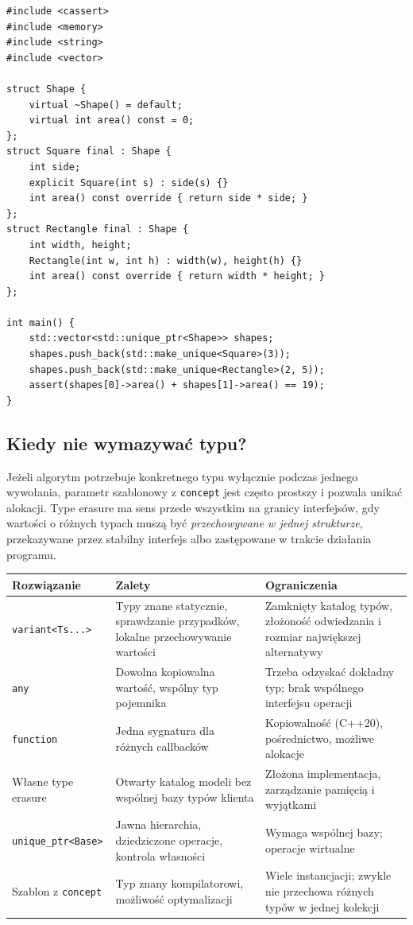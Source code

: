 \begin{lstlisting}[caption={Polimorfizm przez bazę i \texttt{unique\_ptr}; kompletny program.}]
#include <cassert>
#include <memory>
#include <string>
#include <vector>

struct Shape {
    virtual ~Shape() = default;
    virtual int area() const = 0;
};
struct Square final : Shape {
    int side;
    explicit Square(int s) : side(s) {}
    int area() const override { return side * side; }
};
struct Rectangle final : Shape {
    int width, height;
    Rectangle(int w, int h) : width(w), height(h) {}
    int area() const override { return width * height; }
};

int main() {
    std::vector<std::unique_ptr<Shape>> shapes;
    shapes.push_back(std::make_unique<Square>(3));
    shapes.push_back(std::make_unique<Rectangle>(2, 5));
    assert(shapes[0]->area() + shapes[1]->area() == 19);
}
\end{lstlisting}

\subsection{Kiedy nie wymazywać typu?}

Jeżeli algorytm potrzebuje konkretnego typu wyłącznie podczas jednego
wywołania, parametr szablonowy z \texttt{concept} jest często prostszy
i pozwala unikać alokacji. Type erasure ma sens przede wszystkim na
granicy interfejsów, gdy wartości o różnych typach muszą być
\emph{przechowywane w jednej strukturze}, przekazywane przez stabilny
interfejs albo zastępowane w trakcie działania programu.

\begin{center}
\small
\begin{tabularx}{\textwidth}{@{}lXX@{}}
\toprule
\textbf{Rozwiązanie} & \textbf{Zalety} & \textbf{Ograniczenia} \\
\midrule
\texttt{variant<Ts...>} & Typy znane statycznie, sprawdzanie przypadków, lokalne przechowywanie wartości & Zamknięty katalog typów, złożoność odwiedzania i rozmiar największej alternatywy \\
\texttt{any} & Dowolna kopiowalna wartość, wspólny typ pojemnika & Trzeba odzyskać dokładny typ; brak wspólnego interfejsu operacji \\
\texttt{function} & Jedna sygnatura dla różnych callbacków & Kopiowalność (C++20), pośrednictwo, możliwe alokacje \\
Własne type erasure & Otwarty katalog modeli bez wspólnej bazy typów klienta & Złożona implementacja, zarządzanie pamięcią i wyjątkami \\
\texttt{unique\_ptr<Base>} & Jawna hierarchia, dziedziczone operacje, kontrola własności & Wymaga wspólnej bazy; operacje wirtualne \\
Szablon z \texttt{concept} & Typ znany kompilatorowi, możliwość optymalizacji & Wiele instancjacji; zwykle nie przechowa różnych typów w jednej kolekcji \\
\bottomrule
\end{tabularx}
\end{center}

